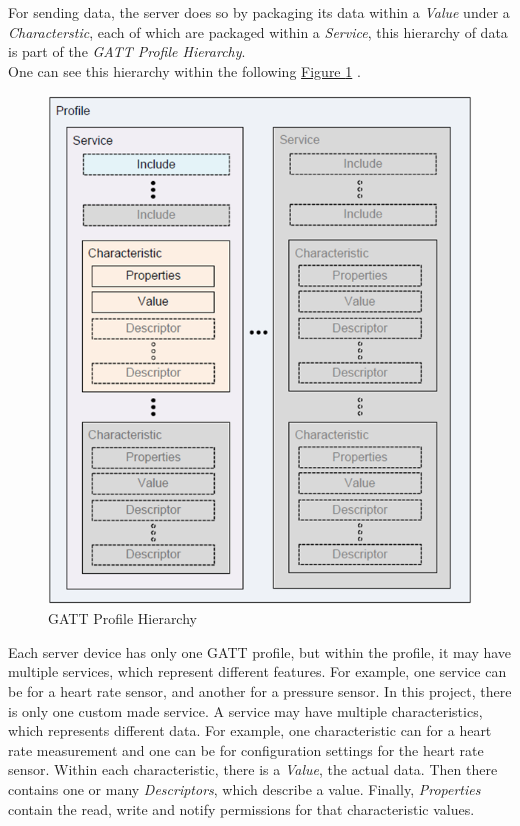 For sending data, the server does so by packaging its data within a \textit{Value} under a \textit{Characterstic}, each of which are packaged within a \textit{Service}, this hierarchy of data is part of the \textit{GATT Profile Hierarchy}.\\
One can see this hierarchy within the following \hyperref[fig:uiscreenshot]{Figure \ref{fig:gatt}} \cite{gatt}.\\
\begin{figure}[h]
	\caption{GATT Profile Hierarchy}\label{fig:gatt}
	\begin{center}
		\includegraphics[width=3 inch]{GATT_Profile_Hierarchy.png}
	\end{center}
\end{figure}

Each server device has only one GATT profile, but within the profile, it may have multiple services, which represent different features. 
For example, one service can be for a heart rate sensor, and another for a pressure sensor. 
In this project, there is only one custom made service. 
A service may have multiple characteristics, which represents different data. 
For example, one characteristic can for a heart rate measurement and one can be for configuration settings for the heart rate sensor.
Within each characteristic, there is a \textit{Value}, the actual data. 
Then there contains one or many \textit{Descriptors}, which describe a value. 
Finally, \textit{Properties} contain the read, write and notify permissions for that characteristic values.\\